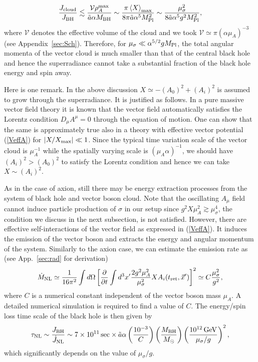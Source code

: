 \documentclass[%
 preprint,
 nofootinbib,
 amsmath,amssymb,
 aps,
 a4paper
]{revtex4-1}
\begin{document}
\begin{align}
	\frac{J_{\rm cloud}}{J_{\rm BH}} \lesssim \frac{\mathcal V \rho_A^{\rm max}}{\tilde{a}\alpha M_{\rm BH}} \sim \frac{\pi \left<X\right>_{\rm max}}{8\pi\tilde a\alpha^5 M_{\rm Pl}^2}
	\sim \frac{\mu_\sigma^2}{8\tilde a\alpha^5 g^2 M_{\rm Pl}^2},
\end{align}
where $\mathcal V$ denotes the effective volume of the cloud and we took $\mathcal V \simeq\pi (\alpha \mu_A)^{-3}$ (see Appendix~\ref{sec:Sch}). Therefore, for $\mu_\sigma\ll \alpha^{5/2} g M_{\rm Pl}$, the total angular momenta of the vector cloud is much smaller than that of the central black hole and hence the superradiance cannot take a substantial fraction of the black hole energy and spin away.

Here is one remark. In the above discussion $X\simeq -(A_0)^2 + (A_i)^2$ is assumed to grow through the superradiance. It is justified as follows. In a pure massive vector field theory it is known that the vector field automatically satisfies the Lorentz condition $D_\mu A^\mu=0$ through the equation of motion. One can show that the same is approximately true also in a theory with effective vector potential (\ref{VeffA}) for $|X/X_{\rm max}| \ll 1$. Since the typical time variation scale of the vector cloud is $\mu_A^{-1}$ while the spatially varying scale is $(\mu_A\alpha)^{-1}$, we should have $(A_i)^2 > (A_0)^2$ to satisfy the Lorentz condition and hence we can take $X \sim (A_i)^2$.

As in the case of axion, still there may be energy extraction processes from the system of black hole and vector boson cloud. 
Note that the oscillating $A_\mu$ field cannot induce particle production of $\sigma$ in our setup since $g^2 X\mu_A^2 \gtrsim \mu_\sigma^4$, the condition we discuss in the next subsection, is not satisfied.
However, there are effective self-interactions of the vector field as expressed in (\ref{VeffA}). It induces the emission of the vector boson and extracts the energy and angular momentum of the system. Similarly to the axion case, we can estimate the emission rate as (see App.~\ref{sec:rad} for derivation)
\begin{align}
	\dot M_{\rm NL} \simeq \frac{1}{16\pi^2} \int d\Omega \left[\frac{\partial}{\partial t}\int d^3 x' \frac{2g^2\mu_A^2}{\mu_\sigma^2} X A_i (t_{\rm ret},\vec x') \right]^2 \simeq C \frac{\mu_\sigma^2}{g^2},
	\label{MNL_hidden}
\end{align}
where $C$ is a numerical constant independent of the vector boson mass $\mu_A$. A detailed numerical simulation is required to find a value of $C$. The energy/spin loss time scale of the black hole is then given by
\begin{align}
	\tau_{\rm NL} \sim \frac{J_{\rm BH}}{\dot J_{\rm NL}} \sim 7\times 10^{11}\,{\rm sec}\times \tilde a\alpha\left( \frac{10^{-3}}{C} \right)
	\left( \frac{M_{\rm BH}}{M_\odot} \right)
	\left( \frac{10^{12}\,{\rm GeV}}{\mu_\sigma/g} \right)^2,
\end{align}
which significantly depends on the value of $\mu_\sigma/g$.
\end{document}
